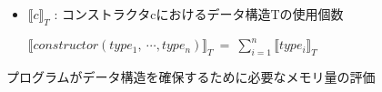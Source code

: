 \begin{figure}[p]
\begin{framed}
\begin{itemize}
  \item $\llbracket c \rrbracket _T $ : コンストラクタcにおけるデータ構造Tの使用個数 \vspace{10pt}

  \begin{math}
    \llbracket
      constructor(type_1, \ \cdots, type_n)
    \rrbracket _T
    \ = \
    \sum^n_{i=1} \llbracket type_i \rrbracket _T
  \end{math}
  \vspace{10pt}
\end{itemize}
\end{framed}
\caption{プログラムがデータ構造を確保するために必要なメモリ量の評価}
\label{fig:memory-eval}
\end{figure}
